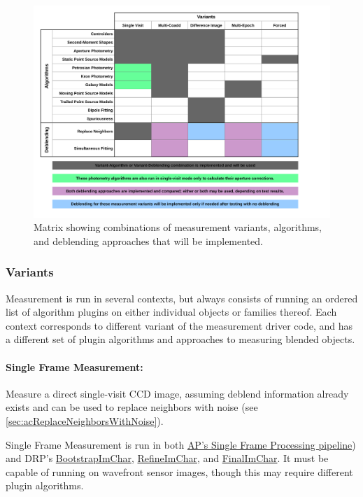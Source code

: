 \begin{figure}
\centering
\includegraphics[width=\textwidth]{figures/measurement-matrix.pdf}
\caption{Matrix showing combinations of measurement variants, algorithms, and deblending approaches that will be implemented.
\label{fig:measurement-matrix}}
\end{figure}

\subsubsection{Variants}
Measurement is run in several contexts, but always consists of running an ordered list of algorithm plugins on either individual objects or families thereof.  Each context corresponds to different variant of the measurement driver code, and has a different set of plugin algorithms and approaches to measuring blended objects.

\paragraph{Single Frame Measurement:} Measure a direct single-visit CCD image, assuming deblend information already exists and can be used to replace neighbors with noise (see \ref{sec:acReplaceNeighborsWithNoise}).
\label{sec:acSingleFrameMeasurement}

Single Frame Measurement is run in both \hyperref[sec:apSingleFrameProcessing]{AP's Single Frame Processing pipeline}) and DRP's \hyperref[sec:drpBootstrapImChar]{BootstrapImChar}, \hyperref[sec:drpRefineImChar]{RefineImChar}, and \hyperref[sec:drpFinalImChar]{FinalImChar}.  It must be capable of running on wavefront sensor images, though this may require different plugin algorithms.

